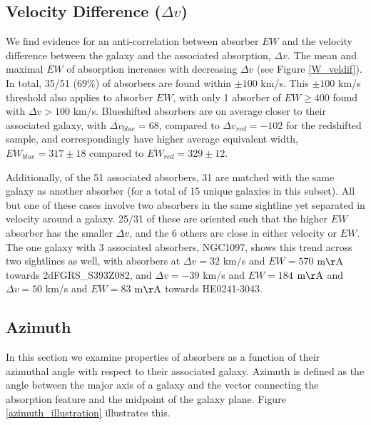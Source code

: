 \documentclass[iop]{emulateapj-rtx4}
\begin{document}
\subsection{Velocity Difference \rm($\Delta v$\rm)}

We find evidence for an anti-correlation between absorber $EW$ and the velocity difference between the galaxy and the associated absorption, $\Delta v$. The mean and maximal $EW$ of absorption increases with decreasing $\Delta v$ (see Figure \ref{W_veldif}). In total, 35/51 ($69\%$) of absorbers are found within $\pm100$ km/s. This $\pm100$ km/s threshold also applies to absorber $EW$, with only 1 absorber of $EW \geq 400$ found with $\Delta v > 100$ km/s. Blueshifted absorbers are on average closer to their associated galaxy, with $\overline{\Delta v}_{blue} = 68$, compared to $\overline{\Delta v}_{red}=-102$ for the redshifted sample, and correspondingly have higher average equivalent width, $\overline{EW}_{blue}=317\pm18$ compared to $\overline{EW}_{red}=329\pm12$.

Additionally, of the 51 associated absorbers, 31 are matched with the same galaxy as another absorber (for a total of 15 unique galaxies in this subset). All but one of these cases involve two absorbers in the same sightline yet separated in velocity around a galaxy. 25/31 of these are oriented such that the higher $EW$ absorber has the smaller $\Delta v$, and the 6 others are close in either velocity or $EW$. The one galaxy with 3 associated absorbers, NGC1097, shows this trend across two sightlines as well, with absorbers at $\Delta v = 32$ km/s and $EW = 570$ $\rm m\AA$ towards 2dFGRS\_S393Z082, and $\Delta v = -39$ km/s and $EW = 184$ $\rm m\AA$ and $\Delta v = 50$ km/s and $EW = 83$ $\rm m\AA$ towards HE0241-3043.



\subsection{Azimuth}
In this section we examine properties of absorbers as a function of their azimuthal angle with respect to their associated galaxy. Azimuth is defined as the angle between the major axis of a galaxy and the vector connecting the absorption feature and the midpoint of the galaxy plane. Figure \ref{azimuth_illustration} illustrates this. 
\end{document}
